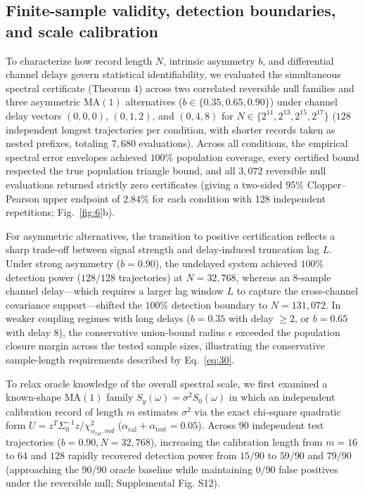 \documentclass[aps,pre,reprint,amsmath,amssymb,superscriptaddress]{revtex4-2}
\begin{document}
\subsection{Finite-sample validity, detection boundaries, and scale calibration}

To characterize how record length $N$, intrinsic asymmetry $b$, and differential channel delays govern statistical identifiability, we evaluated the simultaneous spectral certificate (Theorem 4) across two correlated reversible null families and three asymmetric $\text{MA}(1)$ alternatives ($b \in \{0.35, 0.65, 0.90\}$) under channel delay vectors $(0,0,0)$, $(0,1,2)$, and $(0,4,8)$ for $N \in \{2^{11}, 2^{13}, 2^{15}, 2^{17}\}$ ($128$ independent longest trajectories per condition, with shorter records taken as nested prefixes, totaling $7,680$ evaluations). Across all conditions, the empirical spectral error envelopes achieved $100\%$ population coverage, every certified bound respected the true population triangle bound, and all $3,072$ reversible null evaluations returned strictly zero certificates (giving a two-sided $95\%$ Clopper--Pearson upper endpoint of $2.84\%$ for each condition with 128 independent repetitions; Fig.~\ref{fig:6}b).

For asymmetric alternatives, the transition to positive certification reflects a sharp trade-off between signal strength and delay-induced truncation lag $L$. Under strong asymmetry ($b = 0.90$), the undelayed system achieved $100\%$ detection power ($128/128$ trajectories) at $N = 32,768$, whereas an $8$-sample channel delay---which requires a larger lag window $L$ to capture the cross-channel covariance support---shifted the $100\%$ detection boundary to $N = 131,072$. In weaker coupling regimes with long delays ($b = 0.35$ with delay $\ge 2$, or $b = 0.65$ with delay $8$), the conservative union-bound radius $\epsilon$ exceeded the population closure margin across the tested sample sizes, illustrating the conservative sample-length requirements described by Eq.~\eqref{eq:30}.

To relax oracle knowledge of the overall spectral scale, we first examined a known-shape $\text{MA}(1)$ family $S_y(\omega) = \sigma^2 S_0(\omega)$ in which an independent calibration record of length $m$ estimates $\sigma^2$ via the exact chi-square quadratic form $U = z^T \Sigma_0^{-1} z / \chi^2_{\alpha_{\mathrm{cal}}, md}$ ($\alpha_{\mathrm{cal}} + \alpha_{\mathrm{test}} = 0.05$). Across $90$ independent test trajectories ($b = 0.90, N = 32,768$), increasing the calibration length from $m = 16$ to $64$ and $128$ rapidly recovered detection power from $15/90$ to $59/90$ and $79/90$ (approaching the $90/90$ oracle baseline while maintaining $0/90$ false positives under the reversible null; Supplemental Fig. S12).
\end{document}
